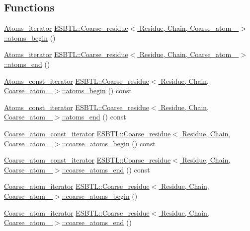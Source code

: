 \subsection*{Functions}
\begin{DoxyCompactItemize}
\item 
\hyperlink{group__grp__iters_ga8081408a6d91ed2a777111e2b2651ad4}{Atoms\+\_\+iterator} \hyperlink{group__grp__iters_ga35aadf6bfc69effe4dd4a55b09e8a1ca}{E\+S\+B\+T\+L\+::\+Coarse\+\_\+residue$<$ Residue, Chain, Coarse\+\_\+atom\+\_\+ $>$\+::atoms\+\_\+begin} ()
\item 
\hyperlink{group__grp__iters_ga8081408a6d91ed2a777111e2b2651ad4}{Atoms\+\_\+iterator} \hyperlink{group__grp__iters_ga71c3a50b585303176a530b52265b1b9c}{E\+S\+B\+T\+L\+::\+Coarse\+\_\+residue$<$ Residue, Chain, Coarse\+\_\+atom\+\_\+ $>$\+::atoms\+\_\+end} ()
\item 
\hyperlink{group__grp__iters_gabb95e73700fd84dbde6e089927e03a6d}{Atoms\+\_\+const\+\_\+iterator} \hyperlink{group__grp__iters_ga9f73288663701102c207280c7af5a523}{E\+S\+B\+T\+L\+::\+Coarse\+\_\+residue$<$ Residue, Chain, Coarse\+\_\+atom\+\_\+ $>$\+::atoms\+\_\+begin} () const
\item 
\hyperlink{group__grp__iters_gabb95e73700fd84dbde6e089927e03a6d}{Atoms\+\_\+const\+\_\+iterator} \hyperlink{group__grp__iters_gafa5493ec6a094421db2bfbaf17af3a90}{E\+S\+B\+T\+L\+::\+Coarse\+\_\+residue$<$ Residue, Chain, Coarse\+\_\+atom\+\_\+ $>$\+::atoms\+\_\+end} () const
\item 
\hyperlink{group__grp__iters_ga5a4a865846cdde342538df7fc03c80ce}{Coarse\+\_\+atom\+\_\+const\+\_\+iterator} \hyperlink{group__grp__iters_gac0e520e0a924be52cfdfae8921a21d21}{E\+S\+B\+T\+L\+::\+Coarse\+\_\+residue$<$ Residue, Chain, Coarse\+\_\+atom\+\_\+ $>$\+::coarse\+\_\+atoms\+\_\+begin} () const
\item 
\hyperlink{group__grp__iters_ga5a4a865846cdde342538df7fc03c80ce}{Coarse\+\_\+atom\+\_\+const\+\_\+iterator} \hyperlink{group__grp__iters_ga50026c05f269eddb69d9d775df51e442}{E\+S\+B\+T\+L\+::\+Coarse\+\_\+residue$<$ Residue, Chain, Coarse\+\_\+atom\+\_\+ $>$\+::coarse\+\_\+atoms\+\_\+end} () const
\item 
\hyperlink{group__grp__iters_ga09a38741d50d3b7296dae83eb0911e49}{Coarse\+\_\+atom\+\_\+iterator} \hyperlink{group__grp__iters_gab001b6ad15d74ee2879ccc4669e52962}{E\+S\+B\+T\+L\+::\+Coarse\+\_\+residue$<$ Residue, Chain, Coarse\+\_\+atom\+\_\+ $>$\+::coarse\+\_\+atoms\+\_\+begin} ()
\item 
\hyperlink{group__grp__iters_ga09a38741d50d3b7296dae83eb0911e49}{Coarse\+\_\+atom\+\_\+iterator} \hyperlink{group__grp__iters_ga2594d683372e0e198f725d8bd1577adf}{E\+S\+B\+T\+L\+::\+Coarse\+\_\+residue$<$ Residue, Chain, Coarse\+\_\+atom\+\_\+ $>$\+::coarse\+\_\+atoms\+\_\+end} ()

\end{DoxyCompactItemize}
